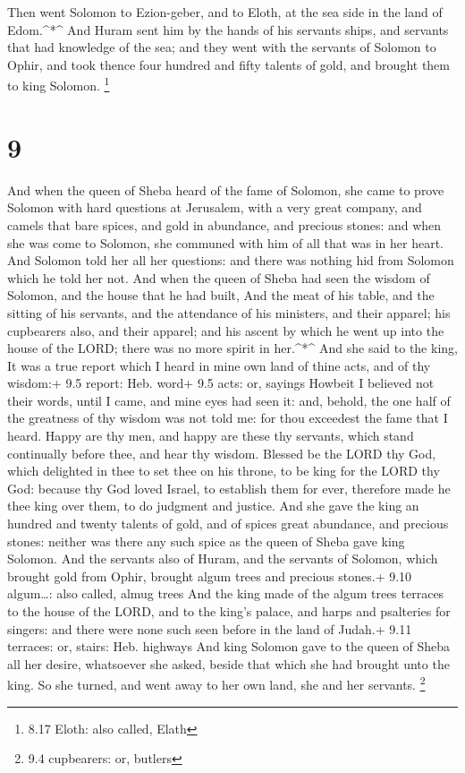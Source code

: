  Then went Solomon to Ezion-geber, and to Eloth, at the sea
side in the land of Edom.\^{}*\^{}  And Huram sent him by
the hands of his servants ships, and servants that had knowledge of the
sea; and they went with the servants of Solomon to Ophir, and took
thence four hundred and fifty talents of gold, and brought them to king
Solomon. \footnote{8.17 Eloth: also called, Elath}

\hypertarget{section-8}{%
\section{9}\label{section-8}}

 And when the queen of Sheba heard of the fame of Solomon,
she came to prove Solomon with hard questions at Jerusalem, with a very
great company, and camels that bare spices, and gold in abundance, and
precious stones: and when she was come to Solomon, she communed with him
of all that was in her heart.  And Solomon told her all her
questions: and there was nothing hid from Solomon which he told her not.
 And when the queen of Sheba had seen the wisdom of Solomon,
and the house that he had built,  And the meat of his table,
and the sitting of his servants, and the attendance of his ministers,
and their apparel; his cupbearers also, and their apparel; and his
ascent by which he went up into the house of the LORD; there was no more
spirit in her.\^{}*\^{}  And she said to the king, It was a
true report which I heard in mine own land of thine acts, and of thy
wisdom:+ 9.5 report: Heb. word+ 9.5 acts: or, sayings 
Howbeit I believed not their words, until I came, and mine eyes had seen
it: and, behold, the one half of the greatness of thy wisdom was not
told me: for thou exceedest the fame that I heard.  Happy
are thy men, and happy are these thy servants, which stand continually
before thee, and hear thy wisdom.  Blessed be the LORD thy
God, which delighted in thee to set thee on his throne, to be king for
the LORD thy God: because thy God loved Israel, to establish them for
ever, therefore made he thee king over them, to do judgment and justice.
 And she gave the king an hundred and twenty talents of
gold, and of spices great abundance, and precious stones: neither was
there any such spice as the queen of Sheba gave king Solomon.
 And the servants also of Huram, and the servants of
Solomon, which brought gold from Ophir, brought algum trees and precious
stones.+ 9.10 algum\ldots: also called, almug trees  And
the king made of the algum trees terraces to the house of the LORD, and
to the king's palace, and harps and psalteries for singers: and there
were none such seen before in the land of Judah.+ 9.11 terraces: or,
stairs: Heb. highways  And king Solomon gave to the queen
of Sheba all her desire, whatsoever she asked, beside that which she had
brought unto the king. So she turned, and went away to her own land, she
and her servants. \footnote{9.4 cupbearers: or, butlers}

